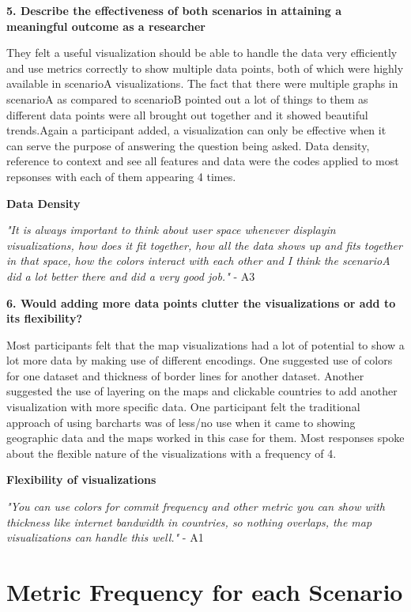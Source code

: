\documentclass[double,12pt]{beavtex}
\begin{document}
\textbf{5. Describe the effectiveness of both scenarios in attaining a meaningful outcome as a researcher}

They felt a useful visualization should be able to handle the data very efficiently and use metrics correctly to show multiple data points, both of which were highly available in scenarioA visualizations. The fact that there were multiple graphs in scenarioA as compared to scenarioB pointed out a lot of things to them as different data points were all brought out together and it showed beautiful trends.Again a participant added, a visualization can only be effective when it can serve the purpose of answering the question being asked. Data density, reference to context and see all features and data were the codes applied to most repsonses with each of them appearing 4 times.

\textbf{Data Density}

{\em "It is always important to think about user space whenever displayin visualizations, how does it fit together, how all the data shows up and fits together in that space, how the colors interact with each other and I think the scenarioA did a lot better there and did a very good job."} - A3

\textbf{6. Would adding more data points clutter the visualizations or add to its flexibility?}

Most participants felt that the map visualizations had a lot of potential to show a lot more data by making use of different encodings. One suggested use of colors for one dataset and thickness of border lines for another dataset. Another suggested the use of layering on the maps and clickable countries to add another visualization with more specific data. One participant felt the traditional approach of using barcharts was of less/no use when it came to showing geographic data and the maps worked in this case for them. Most responses spoke about the flexible nature of the visualizations with a frequency of 4.

\textbf{Flexibility of visualizations}

{\em "You can use colors for commit frequency and other metric you can show with thickness like internet bandwidth in countries, so nothing overlaps, the map visualizations can handle this well."} - A1

\section{Metric Frequency for each Scenario}
\end{document}
